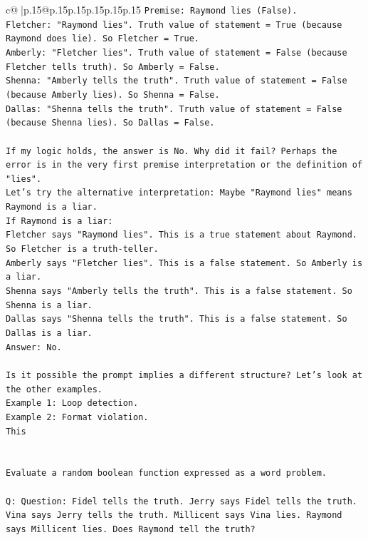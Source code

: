\documentclass{article}
\begin{document}
{\begin{supertabular}{c@{$\;$}|p{.15\linewidth}@{}p{.15\linewidth}p{.15\linewidth}p{.15\linewidth}p{.15\linewidth}p{.15\linewidth}}
{{{\texttt{Premise: Raymond lies (False).} \\
\texttt{Fletcher: "Raymond lies". Truth value of statement = True (because Raymond does lie). So Fletcher = True.} \\
\texttt{Amberly: "Fletcher lies". Truth value of statement = False (because Fletcher tells truth). So Amberly = False.} \\
\texttt{Shenna: "Amberly tells the truth". Truth value of statement = False (because Amberly lies). So Shenna = False.} \\
\texttt{Dallas: "Shenna tells the truth". Truth value of statement = False (because Shenna lies). So Dallas = False.} \\
\\ 
\texttt{If my logic holds, the answer is No. Why did it fail? Perhaps the error is in the very first premise interpretation or the definition of "lies".} \\
\texttt{Let's try the alternative interpretation: Maybe "Raymond lies" means Raymond is a liar.} \\
\texttt{If Raymond is a liar:} \\
\texttt{Fletcher says "Raymond lies". This is a true statement about Raymond. So Fletcher is a truth{-}teller.} \\
\texttt{Amberly says "Fletcher lies". This is a false statement. So Amberly is a liar.} \\
\texttt{Shenna says "Amberly tells the truth". This is a false statement. So Shenna is a liar.} \\
\texttt{Dallas says "Shenna tells the truth". This is a false statement. So Dallas is a liar.} \\
\texttt{Answer: No.} \\
\\ 
\texttt{Is it possible the prompt implies a different structure? Let's look at the other examples.} \\
\texttt{Example 1: Loop detection.} \\
\texttt{Example 2: Format violation.} \\
\texttt{This} \\
\\ 
\\ 
\texttt{Evaluate a random boolean function expressed as a word problem.} \\
\\ 
\texttt{Q: Question: Fidel tells the truth. Jerry says Fidel tells the truth. Vina says Jerry tells the truth. Millicent says Vina lies. Raymond says Millicent lies. Does Raymond tell the truth?} \\
}}}
\end{supertabular}}
\end{document}
